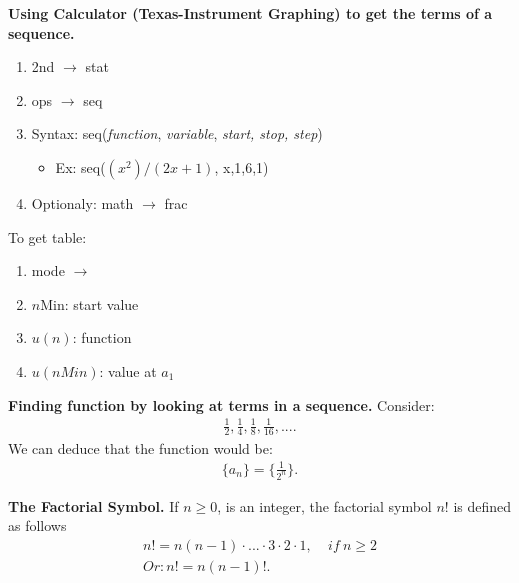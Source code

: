 \documentclass{report}
\begin{document}
    \bigbreak \noindent 
    \begin{mdframed}
      \textbf{Using Calculator (Texas-Instrument Graphing) to get the terms of a sequence.}
      \begin{enumerate}
        \item 2nd $\rightarrow$ stat
        \item ops $\rightarrow$ seq
        \item Syntax: seq(\textit{function}, \textit{variable}, \textit{start, stop, step})
          \begin{itemize}
            \item Ex: seq($(x^{2})/({2x+1})$, x,1,6,1)
          \end{itemize}
        \item Optionaly: math $\rightarrow$ frac
      \end{enumerate}
      \bigbreak \noindent 
      To get table: 
      \begin{enumerate}
        \item mode $\rightarrow$ 
        \item $n$Min: start value
        \item $u(n)$: function
        \item $u(nMin)$: value at $a_{1}$
      \end{enumerate}
    \end{mdframed}
    \bigbreak \noindent 
    \begin{mdframed}
      \textbf{Finding function by looking at terms in a sequence.}
      \bigbreak \noindent 
      Consider:
      \begin{align*}
        \frac{1}{2}, \frac{1}{4}, \frac{1}{8}, \frac{1}{16}, ...
      .\end{align*}
      \bigbreak \noindent 
      We can deduce that the function would be:
      \begin{align*}
        \{a_{n}\} = \bigg\{\frac{1}{2^{n}}\bigg\}
      .\end{align*}
    \end{mdframed}
    \pagebreak \bigbreak \noindent
    \begin{mdframed}
      \textbf{The Factorial Symbol.}
      \bigbreak \noindent 
      If $n \ge 0 $, is an integer, the factorial symbol $n!$ is defined as follows
      \begin{align*}
        n! = n(n-1) \cdot ... \cdot 3 \cdot 2 \cdot 1, \ \ \ \ \ if\ n \ge 2 \\
        Or: n! = n(n-1)!
      .\end{align*}
    \end{mdframed}
\end{document}
